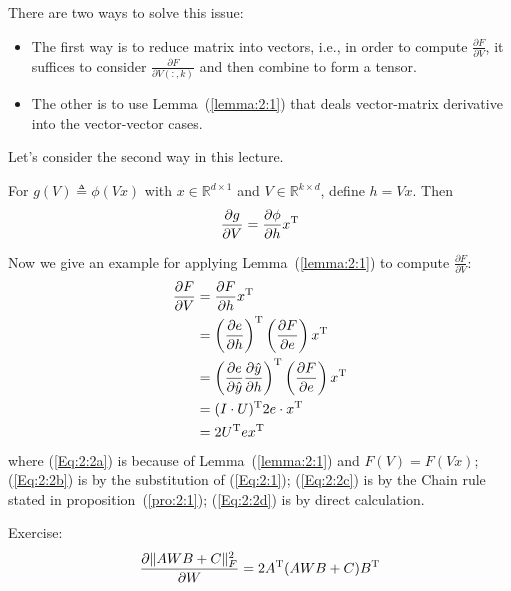 \begin{example}
\begin{itemize}
\begin{enumerate}
There are two ways to solve this issue:
\begin{itemize}
\item
The first way is to reduce matrix into vectors, i.e., in order  to compute $\frac{\partial F}{\partial V}$, it suffices to consider $\frac{\partial F}{\partial V(:,k)}$ and then combine to form a tensor.
\item
The other is to use Lemma~(\ref{lemma:2:1}) that deals vector-matrix derivative into the vector-vector cases.
\end{itemize}
Let's consider the second way in this lecture.
\begin{lemma}\label{lemma:2:1}
For $g(V)\triangleq\phi(Vx)$ with $x\in\mathbb{R}^{d\times 1}$ and $V\in\mathbb{R}^{k\times d}$, define $h=Vx$. Then
\[
\frac{\partial g}{\partial V} = \frac{\partial\phi}{\partial h}x^{\mathrm T}
\]
\end{lemma}
Now we give an example for applying Lemma~(\ref{lemma:2:1}) to compute $\frac{\partial F}{\partial V}$:
\begin{subequations}
\begin{align}
\frac{\partial F}{\partial V} &= \frac{\partial F}{\partial h}x^{\mathrm T}\label{Eq:2:2a}\\
&=\left(\frac{{\partial} e}{{\partial} h} \right)^{\mathrm T}\left(\frac{{\partial} F}{{\partial} e}\right)x^{\mathrm T}\label{Eq:2:2b}\\
&=\left(\frac{{\partial} e}{{\partial} \hat{y}}\frac{{\partial}\hat{y}}{{\partial}h} \right)^{\mathrm T}\left(\frac{{\partial} F}{{\partial} e}\right)x^{\mathrm T}\label{Eq:2:2c}\\
&=(I\cdot U)^{\mathrm T} 2e\cdot x^{\mathrm T}\label{Eq:2:2d}\\
&=2U^{\mathrm T} ex^{\mathrm T}\nonumber
\end{align}
\end{subequations}
where (\ref{Eq:2:2a}) is because of Lemma~(\ref{lemma:2:1}) and $F(V)=F(Vx)$;
(\ref{Eq:2:2b}) is by the substitution of (\ref{Eq:2:1});
(\ref{Eq:2:2c}) is by the Chain rule stated in proposition~(\ref{pro:2:1});
(\ref{Eq:2:2d}) is by direct calculation.
\end{enumerate}
Exercise: 
\[
\frac{\partial \|AWB + C\|_F^2}{\partial W} = 2A^{\mathrm T}(AWB+C)B^{\mathrm T}
\]
\end{itemize}
\end{example}


